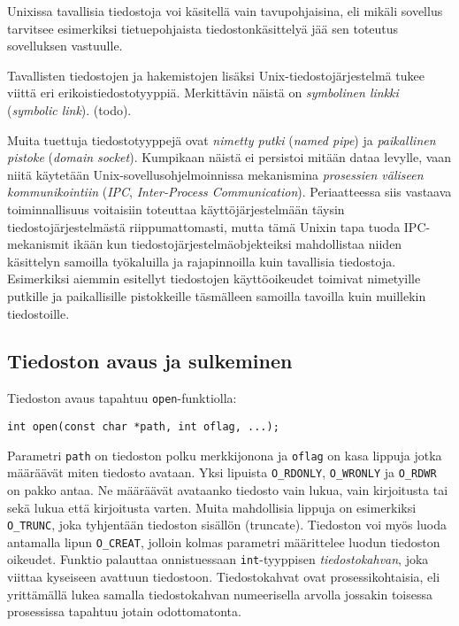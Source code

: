 Unixissa tavallisia tiedostoja voi käsitellä vain tavupohjaisina,
eli mikäli sovellus tarvitsee esimerkiksi tietuepohjaista tiedostonkäsittelyä jää sen toteutus sovelluksen vastuulle.

Tavallisten tiedostojen ja hakemistojen lisäksi Unix-tiedostojärjestelmä tukee viittä eri erikoistiedostotyyppiä.
Merkittävin näistä on \emph{symbolinen linkki} (\emph{symbolic link}). (todo).

Muita tuettuja tiedostotyyppejä ovat \emph{nimetty putki} (\emph{named pipe}) ja \emph{paikallinen pistoke} (\emph{domain socket}).
Kumpikaan näistä ei persistoi mitään dataa levylle,
vaan niitä käytetään Unix-sovellusohjelmoinnissa mekanismina \emph{prosessien väliseen kommunikointiin} (\emph{IPC}, \emph{Inter-Process Communication}).
Periaatteessa siis vastaava toiminnallisuus voitaisiin toteuttaa käyttöjärjestelmään täysin tiedostojärjestelmästä riippumattomasti,
mutta tämä Unixin tapa tuoda IPC-mekanismit ikään kun tiedostojärjestelmäobjekteiksi mahdollistaa niiden käsittelyn samoilla työkaluilla ja rajapinnoilla kuin tavallisia tiedostoja.
Esimerkiksi aiemmin esitellyt tiedostojen käyttöoikeudet toimivat nimetyille putkille ja paikallisille pistokkeille täsmälleen samoilla tavoilla kuin muillekin tiedostoille.

\subsection{Tiedoston avaus ja sulkeminen}
Tiedoston avaus tapahtuu \texttt{open}-funktiolla:

\begin{verbatim}
int open(const char *path, int oflag, ...);
\end{verbatim}

Parametri \texttt{path} on tiedoston polku merkkijonona
ja \texttt{oflag} on kasa lippuja jotka määräävät miten tiedosto avataan.
Yksi lipuista \texttt{O\_RDONLY}, \texttt{O\_WRONLY} ja \texttt{O\_RDWR} on pakko antaa.
Ne määräävät avataanko tiedosto vain lukua, vain kirjoitusta tai sekä lukua että
kirjoitusta varten.
Muita mahdollisia lippuja on esimerkiksi \texttt{O\_TRUNC},
joka tyhjentään tiedoston sisällön (truncate).
Tiedoston voi myös luoda antamalla lipun \texttt{O\_CREAT},
jolloin kolmas parametri määrittelee luodun tiedoston oikeudet.
Funktio palauttaa onnistuessaan \texttt{int}-tyyppisen \emph{tiedostokahvan},
joka viittaa kyseiseen avattuun tiedostoon.
Tiedostokahvat ovat prosessikohtaisia,
eli yrittämällä lukea samalla tiedostokahvan numeerisella arvolla
jossakin toisessa prosessissa tapahtuu jotain odottomatonta.

